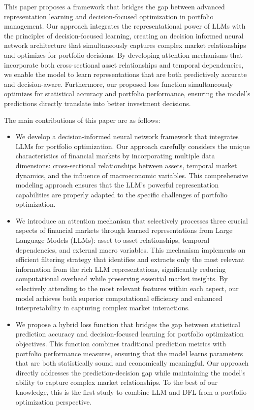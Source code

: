 This paper proposes a framework that bridges the gap between advanced representation learning and decision-focused optimization in portfolio management. Our approach integrates the representational power of LLMs with the principles of decision-focused learning, creating an decision informed neural network architecture that simultaneously captures complex market relationships and optimizes for portfolio decisions. By developing attention mechanisms that incorporate both cross-sectional asset relationships and temporal dependencies, we enable the model to learn representations that are both predictively accurate and decision-aware. Furthermore, our proposed loss function simultaneously optimizes for statistical accuracy and portfolio performance, ensuring the model's predictions directly translate into better investment decisions.

The main contributions of this paper are as follows:
\begin{itemize}
\item We develop a decision-informed neural network framework that integrates LLMs for portfolio optimization. Our approach carefully considers the unique characteristics of financial markets by incorporating multiple data dimensions: cross-sectional relationships between assets, temporal market dynamics, and the influence of macroeconomic variables. This comprehensive modeling approach ensures that the LLM's powerful representation capabilities are properly adapted to the specific challenges of portfolio optimization.
\item We introduce an attention mechanism that selectively processes three crucial aspects of financial markets through learned representations from Large Language Models (LLMs): asset-to-asset relationships, temporal dependencies, and external macro variables. This mechanism implements an efficient filtering strategy that identifies and extracts only the most relevant information from the rich LLM representations, significantly reducing computational overhead while preserving essential market insights.  By selectively attending to the most relevant features within each aspect, our model achieves both superior computational efficiency and enhanced interpretability in capturing complex market interactions.
\item We propose a hybrid loss function that bridges the gap between statistical prediction accuracy and decision-focused learning for portfolio optimization objectives. This function combines traditional prediction metrics with portfolio performance measures, ensuring that the model learns parameters that are both statistically sound and economically meaningful. Our approach directly addresses the prediction-decision gap while maintaining the model's ability to capture complex market relationships. To the best of our knowledge, this is the first study to combine LLM and DFL from a portfolio optimization perspective.

\end{itemize}


